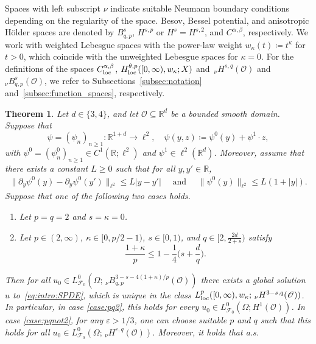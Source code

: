 \documentclass[reqno]{amsart}
\newtheorem{theorem}[Satz]{Theorem}
\newcommand{\R}{\mathbb{R}}
\newcommand{\F}{\mathscr{F}}
\newcommand{\sO}{\mathscr{O}}
\newcommand{\ce}{\coloneqq}
\newcommand{\seq}{\subseteq}
\newcommand{\1}{\mathbf{1}}
\newcommand{\loc}{\textup{loc}}
\newcommand{\nH}{\ensuremath{\,_\nu H}}
\newcommand{\bpsn}[1]{\ensuremath{\nH^{#1}(\sO)}}
\begin{document}
Spaces with left subscript $\nu$ indicate suitable Neumann boundary conditions depending on the regularity of the space. Besov, Bessel potential, and anisotropic Hölder spaces are denoted by $B_{q,p}^s$, $H^{s,p}$ or $H^s=H^{s,2}$, and $C^{\alpha,\beta}$, respectively. We work with weighted Lebesgue spaces with the power-law weight $w_\kappa(t)\ce t^\kappa$ for $t>0$, which coincide with the unweighted Lebesgue spaces for $\kappa=0$. For the definitions of the spaces $C^{\alpha,\beta}_\loc$, $H^{\theta,p}_\loc([0,\infty),w_\kappa;X)$ and $\bpsn{s,q} $ and $_\nu B^{s}_{q,p}(\sO)$, we refer to Subsections~\ref{subsec:notation} and~\ref{subsec:function_spaces}, respectively.  

\begin{theorem}\label{thm:introMain}
    Let $d\in \{3,4\}$, and let $\sO\seq\R^d$ be a bounded smooth domain. 
Suppose that 
  \begin{equation*}
      \psi=(\psi_n)_{n\geq 1}:\R^{1+d}\to \ell^2,\quad \psi(y,z) \ce \psi^0(y)+\psi^1\cdot z,
  \end{equation*}
  with $\psi^0=(\psi^0_n)_{n\geq 1}\in C^1(\R;\ell^2)$ and $\psi^1\in \ell^2(\R^d)$.
 Moreover,  assume that 
 there exists a constant $L\geq0$ such that for all $y,y'\in\R$, 
    \begin{align*}
                \|\partial_y
            \psi^0(y)-\partial_y\psi^0(y')
        \|_{\ell^2}
        \leq L|y-y'| \quad\text{ and }\quad
        \|\psi^0(y)\|_{\ell^2}
        \leq L(1+|y|).
    \end{align*}
    Suppose that one of the following two cases holds.
    \begin{enumerate}[label=(\alph*)]
        \item \label{case:pq2} Let $p=q=2$ and $s=\kappa=0$.
        \item \label{case:pqnot2} Let $p\in (2,\infty)$, $ \kappa\in [0,p/2-1)$, $s\in [0,1)$, and  $q\in [2, \frac{2d}{2+s})$ satisfy
    \begin{equation}\label{eq:thm:introMain}
        \frac{1+\kappa}{p}\le 1-\frac{1}{4}\Big(s+\frac{d}{q}\Big).
    \end{equation}
    \end{enumerate}
     Then for all $u_0\in L^0_{\mathscr{F}_0}(\Omega;\,_\nu B^{3-s-4(1+\kappa)/p}_{q,p}(\sO))$ there exists a global solution $u$ to~\eqref{eq:intro:SPDE}, which is unique in the class $L^p_\loc([0,\infty),w_\kappa;\bpsn{3-s,q})$. In particular, in case \ref{case:pq2}, this holds for every $u_0\in L_{\F_0}^0(\Omega;H^1(\sO))$. In case \ref{case:pqnot2}, for any $\varepsilon>1/3$, one can choose suitable $p$ and $q$ such that this holds for all $u_0\in L_{\F_0}^0(\Omega; \nH^{\varepsilon, q}(\sO))$. Moreover, it holds that a.s.

\end{theorem}
\end{document}
